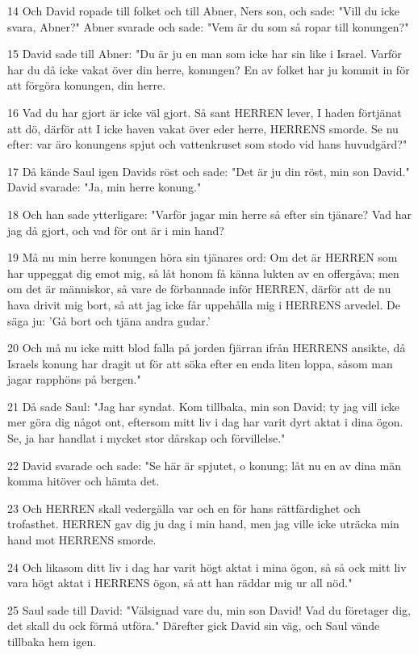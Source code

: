 \par 14 Och David ropade till folket och till Abner, Ners son, och sade: "Vill du icke svara, Abner?" Abner svarade och sade: "Vem är du som så ropar till konungen?"
\par 15 David sade till Abner: "Du är ju en man som icke har sin like i Israel. Varför har du då icke vakat över din herre, konungen? En av folket har ju kommit in för att förgöra konungen, din herre.
\par 16 Vad du har gjort är icke väl gjort. Så sant HERREN lever, I haden förtjänat att dö, därför att I icke haven vakat över eder herre, HERRENS smorde. Se nu efter: var äro konungens spjut och vattenkruset som stodo vid hans huvudgärd?"
\par 17 Då kände Saul igen Davids röst och sade: "Det är ju din röst, min son David." David svarade: "Ja, min herre konung."
\par 18 Och han sade ytterligare: "Varför jagar min herre så efter sin tjänare? Vad har jag då gjort, och vad för ont är i min hand?
\par 19 Må nu min herre konungen höra sin tjänares ord: Om det är HERREN som har uppeggat dig emot mig, så låt honom få känna lukten av en offergåva; men om det är människor, så vare de förbannade inför HERREN, därför att de nu hava drivit mig bort, så att jag icke får uppehålla mig i HERRENS arvedel. De säga ju: 'Gå bort och tjäna andra gudar.'
\par 20 Och må nu icke mitt blod falla på jorden fjärran ifrån HERRENS ansikte, då Israels konung har dragit ut för att söka efter en enda liten loppa, såsom man jagar rapphöns på bergen."
\par 21 Då sade Saul: "Jag har syndat. Kom tillbaka, min son David; ty jag vill icke mer göra dig något ont, eftersom mitt liv i dag har varit dyrt aktat i dina ögon. Se, ja har handlat i mycket stor dårskap och förvillelse."
\par 22 David svarade och sade: "Se här är spjutet, o konung; låt nu en av dina män komma hitöver och hämta det.
\par 23 Och HERREN skall vedergälla var och en för hans rättfärdighet och trofasthet. HERREN gav dig ju dag i min hand, men jag ville icke uträcka min hand mot HERRENS smorde.
\par 24 Och likasom ditt liv i dag har varit högt aktat i mina ögon, så så ock mitt liv vara högt aktat i HERRENS ögon, så att han räddar mig ur all nöd."
\par 25 Saul sade till David: "Välsignad vare du, min son David! Vad du företager dig, det skall du ock förmå utföra." Därefter gick David sin väg, och Saul vände tillbaka hem igen.

